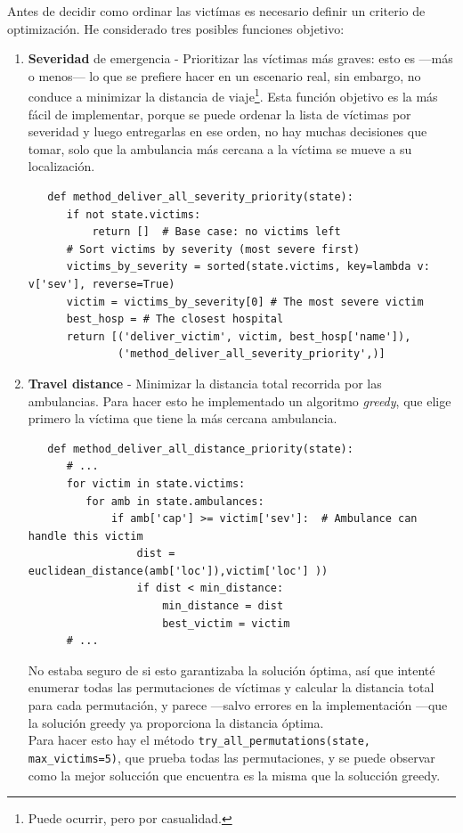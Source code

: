 Antes de decidir como ordinar las victímas es necesario definir un criterio de optimización. He considerado tres posibles funciones objetivo:
\begin{enumerate}
   \item \textbf{Severidad} de emergencia - Prioritizar las víctimas más graves: esto es ---más o menos--- lo que se prefiere hacer en un escenario real, sin embargo, no conduce a minimizar la distancia de viaje\footnote{Puede ocurrir, pero por casualidad.}.
   Esta función objetivo es la más fácil de implementar, porque se puede ordenar la lista de víctimas por severidad y luego entregarlas en ese orden, no hay muchas decisiones que tomar, solo que la ambulancia más cercana a la víctima se mueve a su localización.
   \begin{lstlisting}
   def method_deliver_all_severity_priority(state):
      if not state.victims:
          return []  # Base case: no victims left
      # Sort victims by severity (most severe first)
      victims_by_severity = sorted(state.victims, key=lambda v: v['sev'], reverse=True)
      victim = victims_by_severity[0] # The most severe victim
      best_hosp = # The closest hospital
      return [('deliver_victim', victim, best_hosp['name']),
              ('method_deliver_all_severity_priority',)]
   \end{lstlisting}
   \item \textbf{Travel distance} - Minimizar la distancia total recorrida por las ambulancias. Para hacer esto he implementado un algoritmo \textit{greedy}, que elige primero la víctima que tiene la más cercana ambulancia. 
   \begin{lstlisting}
   def method_deliver_all_distance_priority(state):
      # ...
      for victim in state.victims:
         for amb in state.ambulances:
             if amb['cap'] >= victim['sev']:  # Ambulance can handle this victim
                 dist = euclidean_distance(amb['loc']),victim['loc'] ))
                 if dist < min_distance:
                     min_distance = dist
                     best_victim = victim
      # ...
   \end{lstlisting}

   No estaba seguro de si esto garantizaba la solución óptima, así que intenté enumerar todas las permutaciones de víctimas y calcular la distancia total para cada permutación, y parece ---salvo errores en la implementación ---que la solución greedy ya proporciona la distancia óptima.\\
   Para hacer esto hay el método \lstinline|try_all_permutations(state, max_victims=5)|, que prueba todas las permutaciones, y se puede observar como la mejor solucción que encuentra es la misma que la solucción greedy.


\end{enumerate}
